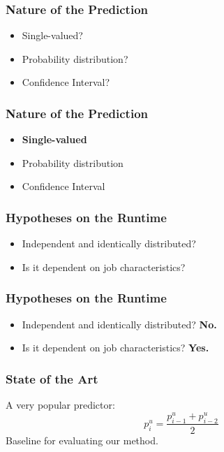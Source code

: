 \documentclass{beamer}
\begin{document}
\begin{frame}
  \frametitle{Nature of the Prediction}
\begin{itemize}
  \item Single-valued?
  \item Probability distribution?
  \item Confidence Interval?
\end{itemize}
\end{frame}

\begin{frame}
  \frametitle{Nature of the Prediction}
\begin{itemize}
  \item \textbf{Single-valued}
  \item Probability distribution
  \item Confidence Interval
\end{itemize}
\end{frame}

\begin{frame}
  \frametitle{Hypotheses on the Runtime}
  \begin{itemize}
    \item Independent and identically distributed?
    \item Is it dependent on job characteristics?
  \end{itemize}
\end{frame}

\begin{frame}
  \frametitle{Hypotheses on the Runtime}
  \begin{itemize}
    \item Independent and identically distributed? \textbf{No.}
    \item Is it dependent on job characteristics? \textbf{Yes.}
  \end{itemize}
\end{frame}


\begin{frame}
  \frametitle{State of the Art}

  \centering
  A very popular predictor:
  \[
    p_i^u =\frac{p_{i-1}^u+ p_{i-2}^u}{2}
  \]
  Baseline for evaluating our method.

\end{frame}


\end{document}
